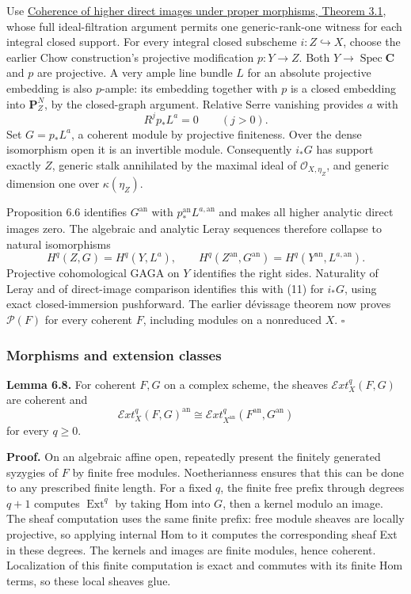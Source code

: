 \documentclass[11pt]{article}
\begin{document}
Use
\href{proper-morphisms-and-coherent-direct-images.html\#3-the-property-form-of-dévissage}{Coherence
of higher direct images under proper morphisms, Theorem 3.1}, whose full
ideal-filtration argument permits one generic-rank-one witness for each
integral closed support. For every integral closed subscheme
\(i:Z\hookrightarrow X\), choose the earlier Chow construction's
projective modification \(p:Y\to Z\). Both
\(Y\to\operatorname{Spec}\mathbf C\) and \(p\) are projective. A very
ample line bundle \(L\) for an absolute projective embedding is also
\(p\)-ample: its embedding together with \(p\) is a closed embedding
into \(\mathbf P^N_Z\), by the closed-graph argument. Relative Serre
vanishing provides \(a\) with \[
R^jp_*L^a=0\qquad(j>0).
\] Set \(G=p_*L^a\), a coherent module by projective finiteness. Over
the dense isomorphism open it is an invertible module. Consequently
\(i_*G\) has support exactly \(Z\), generic stalk annihilated by the
maximal ideal of \(\mathcal O_{X,\eta_Z}\), and generic dimension one
over \(\kappa(\eta_Z)\).

Proposition 6.6 identifies \(G^{\mathrm{an}}\) with
\(p^{\mathrm{an}}_*L^{a,\mathrm{an}}\) and makes all higher analytic
direct images zero. The algebraic and analytic Leray sequences therefore
collapse to natural isomorphisms \[
H^q(Z,G)=H^q(Y,L^a),\qquad
H^q(Z^{\mathrm{an}},G^{\mathrm{an}})=H^q(Y^{\mathrm{an}},L^{a,\mathrm{an}}).
\] Projective cohomological GAGA on \(Y\) identifies the right sides.
Naturality of Leray and of direct-image comparison identifies this with
(11) for \(i_*G\), using exact closed-immersion pushforward. The earlier
dévissage theorem now proves \(\mathcal P(F)\) for every coherent \(F\),
including modules on a nonreduced \(X\). \(\square\)

\subsubsection{Morphisms and extension
classes}\label{morphisms-and-extension-classes}

\textbf{Lemma 6.8.} For coherent \(F,G\) on a complex scheme, the
sheaves \(\mathcal Ext^q_X(F,G)\) are coherent and \[
\mathcal Ext^q_X(F,G)^{\mathrm{an}}
\cong\mathcal Ext^q_{X^{\mathrm{an}}}(F^{\mathrm{an}},G^{\mathrm{an}})
\tag{12}
\] for every \(q\ge0\).

\textbf{Proof.} On an algebraic affine open, repeatedly present the
finitely generated syzygies of \(F\) by finite free modules.
Noetherianness ensures that this can be done to any prescribed finite
length. For a fixed \(q\), the finite free prefix through degrees
\(q+1\) computes \(\operatorname{Ext}^q\) by taking Hom into \(G\), then
a kernel modulo an image. The sheaf computation uses the same finite
prefix: free module sheaves are locally projective, so applying internal
Hom to it computes the corresponding sheaf Ext in these degrees. The
kernels and images are finite modules, hence coherent. Localization of
this finite computation is exact and commutes with its finite Hom terms,
so these local sheaves glue.
\end{document}
